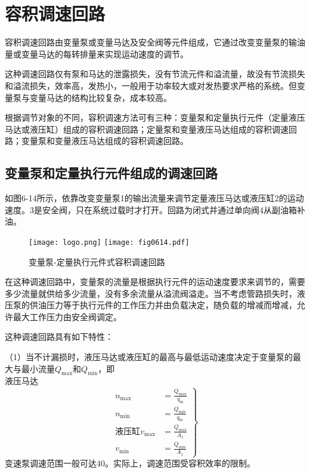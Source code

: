 \section{容积调速回路}
容积调速回路由变量泵或变量马达及安全阀等元件组成，它通过改变变量泵的输油量或变量马达的每转排量来实现运动速度的调节。

这种调速回路仅有泵和马达的泄露损失，没有节流元件和溢流量，故没有节流损失和溢流损失，效率高，发热小，一般用于功率较大或对发热要求严格的系统。但变量泵与变量马达的结构比较复杂，成本较高。

根据调节对象的不同，容积调速方法可有三种：变量泵和定量执行元件（定量液压马达或液压缸）组成的容积调速回路；定量泵和变量液压马达组成的容积调速回路；变量泵和变量液压马达组成的容积调速回路。
\subsection{变量泵和定量执行元件组成的调速回路}
如图6-14所示，依靠改变变量泵1的输出流量来调节定量液压马达或液压缸2的运动速度。3是安全阀，只在系统过载时才打开。回路为闭式并通过单向阀4从副油箱补油。
\begin{figure}\centering
\ifOpenSource
\texttt{[image: logo.png]}
\else
\texttt{[image: fig0614.pdf]}
\fi
\caption{变量泵-定量执行元件式容积调速回路}
\label{fig:fig0614}
\end{figure}

在这种调速回路中，变量泵的流量是根据执行元件的运动速度要求来调节的，需要多少流量就供给多少流量，没有多余流量从溢流阀溢走。当不考虑管路损失时，液压泵的供油压力等于执行元件的工作压力并由负载决定，随负载的增减而增减，允许最大工作压力由安全阀调定。

这种调速回路具有如下特性：

（1）当不计漏损时，液压马达或液压缸的最高与最低运动速度决定于变量泵的最大与最小流量$Q_\text{max}$和$Q_\text{min}$，即\\
液压马达
\begin{equation}
\left.
\begin{aligned}
n_\text{max}&=\frac{Q_\text{max}}{q_\text{m}}\\
n_\text{min}&=\frac{Q_\text{min}}{q_\text{m}}\\
\text{液压缸}
v_\text{max}&=\frac{Q_\text{max}}{A_\text{1}}\\
v_\text{min}&=\frac{Q_\text{min}}{A_\text{1}}
\end{aligned}
\right\}
\end{equation}
变速泵调速范围一般可达40。实际上，调速范围受容积效率的限制。

